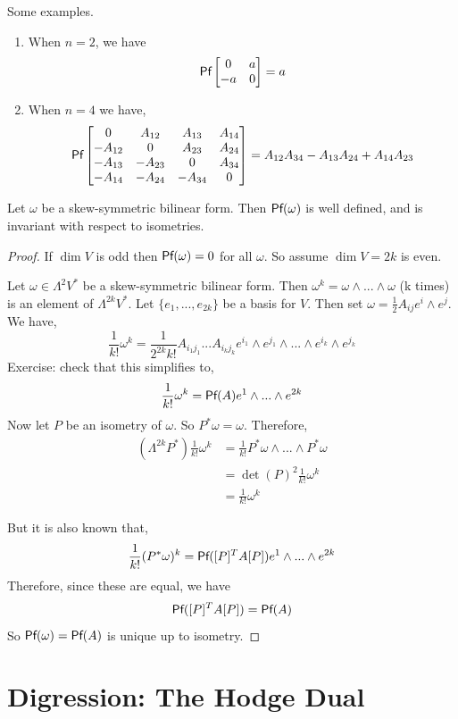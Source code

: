 \begin{example}
Some examples.
    \begin{enumerate}
    \item {When $n=2$, we have
    \[\operatorname{\textsf{Pf}}\begin{bmatrix}0&a\\-a&0\end{bmatrix} = a\]
    }
    \item {
    When $n=4$ we have,
    \[\operatorname{\textsf{Pf}}\begin{bmatrix}0&A_{12}&A_{13}&A_{14}\\
    -A_{12}&0&A_{23}&A_{24}\\
    -A_{13}&-A_{23}&0&A_{34}\\
    -A_{14}&-A_{24}&-A_{34}&0\end{bmatrix} = A_{12}A_{34}-A_{13}A_{24}+A_{14}A_{23}
    \]
    }
    \end{enumerate}
\end{example}
\begin{thm}
    Let $\omega$ be a skew-symmetric bilinear form. Then $\operatorname{\textsf{Pf}}(\omega)$ is well defined, and is invariant with respect to isometries.
\end{thm}
\begin{proof}
If $\dim V$ is odd then $\operatorname{\textsf{Pf}}(\omega)=0$ for all $\omega$. So assume $\dim V=2k$ is even.

    Let $\omega \in \Lambda^{2} V^*$ be a skew-symmetric bilinear form. Then $\omega^k = \omega\wedge...\wedge \omega$ (k times) is an element of $\Lambda^{2k}V^*$. Let $\{e_1,...,e_{2k}\}$ be a basis for $V$. Then set $\omega = \frac{1}{2}A_{ij} e^i \wedge e^j$. We have,
    \[\frac{1}{k!}\omega^k = \frac{1}{2^{2k}k!}A_{i_1j_1}...A_{i_{k}j_{k}} e^{i_1}\wedge e^{j_1}\wedge...\wedge e^{i_k}\wedge e^{j_k}\]
    Exercise: check that this simplifies to,
    \[\frac{1}{k!}\omega^k = \operatorname{\textsf{Pf}}(A) e^1\wedge...\wedge e^{2k}\]
    Now let $P$ be an isometry of $\omega$. So $P^* \omega = \omega$. Therefore,
    \begin{align*}(\Lambda^{2k} P^*)\frac{1}{k!}\omega^k &= \frac{1}{k!}P^*\omega\wedge...\wedge P^* \omega \\&= \det(P)^2\frac{1}{k!} \omega^k\\& = \frac{1}{k!}\omega^k\end{align*}

    But it is also known that,
    \[\frac{1}{k!}(P^* \omega)^k = \operatorname{\textsf{Pf}}([P]^T A [P]) e^1\wedge...\wedge e^{2k}\]
    Therefore, since these are equal, we have
    \[\operatorname{\textsf{Pf}}([P]^T A [P]) = \operatorname{\textsf{Pf}}(A)\]
    So $\operatorname{\textsf{Pf}}(\omega) = \operatorname{\textsf{Pf}}(A)$ is unique up to isometry.
 \end{proof}

\section{Digression: The Hodge Dual}
